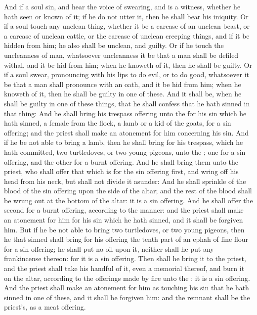 \begin{biblechapter} %
\verse And if a soul sin, and hear the voice of swearing, and is a witness, whether he hath seen or known of it; if he do not utter it, then he shall bear his iniquity.
\verse Or if a soul touch any unclean thing, whether it be a carcase of an unclean beast, or a carcase of unclean cattle, or the carcase of unclean creeping things, and if it be hidden from him; he also shall be unclean, and guilty.
\verse Or if he touch the uncleanness of man, whatsoever uncleanness it be that a man shall be defiled withal, and it be hid from him; when he knoweth of it, then he shall be guilty.
\verse Or if a soul swear, pronouncing with his lips to do evil, or to do good, whatsoever it be that a man shall pronounce with an oath, and it be hid from him; when he knoweth of it, then he shall be guilty in one of these.
\verse And it shall be, when he shall be guilty in one of these things, that he shall confess that he hath sinned in that thing:
\verse And he shall bring his trespass offering unto the \LORD for his sin which he hath sinned, a female from the flock, a lamb or a kid of the goats, for a sin offering; and the priest shall make an atonement for him concerning his sin.
\verse And if he be not able to bring a lamb, then he shall bring for his trespass, which he hath committed, two turtledoves, or two young pigeons, unto the \LORD; one for a sin offering, and the other for a burnt offering.
\verse And he shall bring them unto the priest, who shall offer that which is for the sin offering first, and wring off his head from his neck, but shall not divide it asunder:
\verse And he shall sprinkle of the blood of the sin offering upon the side of the altar; and the rest of the blood shall be wrung out at the bottom of the altar: it is a sin offering.
\verse And he shall offer the second for a burnt offering, according to the manner: and the priest shall make an atonement for him for his sin which he hath sinned, and it shall be forgiven him.
\verse But if he be not able to bring two turtledoves, or two young pigeons, then he that sinned shall bring for his offering the tenth part of an ephah of fine flour for a sin offering; he shall put no oil upon it, neither shall he put any frankincense thereon: for it is a sin offering.
\verse Then shall he bring it to the priest, and the priest shall take his handful of it, even a memorial thereof, and burn it on the altar, according to the offerings made by fire unto the \LORD: it is a sin offering.
\verse And the priest shall make an atonement for him as touching his sin that he hath sinned in one of these, and it shall be forgiven him: and the remnant shall be the priest's, as a meat offering.

\end{biblechapter}
